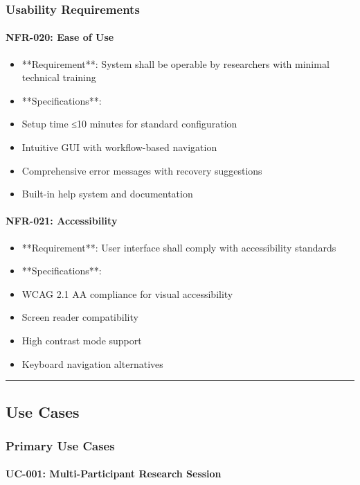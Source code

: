 \documentclass[12pt,a4paper]{report}
\begin{document}
\subsubsection{Usability Requirements}

\paragraph{NFR-020: Ease of Use}

\begin{itemize}
\item **Requirement**: System shall be operable by researchers with minimal technical training
\item **Specifications**:
\item Setup time ≤10 minutes for standard configuration
\item Intuitive GUI with workflow-based navigation
\item Comprehensive error messages with recovery suggestions
\item Built-in help system and documentation

\end{itemize}
\paragraph{NFR-021: Accessibility}

\begin{itemize}
\item **Requirement**: User interface shall comply with accessibility standards
\item **Specifications**:
\item WCAG 2.1 AA compliance for visual accessibility
\item Screen reader compatibility
\item High contrast mode support
\item Keyboard navigation alternatives

\end{itemize}
\hrule

\subsection{Use Cases}

\subsubsection{Primary Use Cases}

\paragraph{UC-001: Multi-Participant Research Session}
\end{document}

